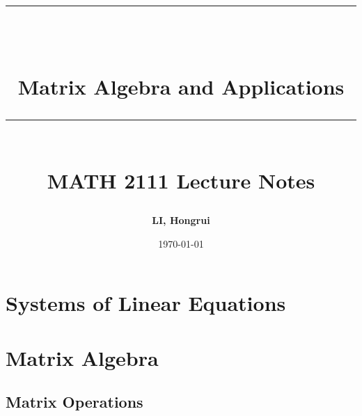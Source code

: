 \documentclass[10pt, a4paper]{article}
\newcommand{\HRule}[1]{\rule{\linewidth}{#1}}
\begin{document}
\title{ \normalsize \textsc{}
\\ [2.0cm]
\HRule{1.5pt} \\ [0.3cm]
\LARGE {\textbf{Matrix Algebra and Applications}
\HRule{1.5pt} \\ [0.6cm]
\LARGE{\textbf{MATH 2111 Lecture Notes}} \vspace*{10\baselineskip}}
}
\date{\today}
\author{\textbf{LI, Hongrui}}  %
\maketitle

\clearpage
\tableofcontents
\newpage


\section{Systems of Linear Equations}
\newpage


\section{Matrix Algebra}
\subsection{Matrix Operations}
\end{document}
